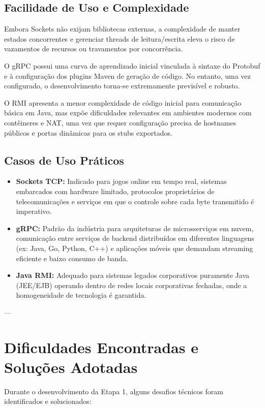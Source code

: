 \documentclass[12pt,a4paper]{article}
\begin{document}
\subsection{Facilidade de Uso e Complexidade}
Embora Sockets não exijam bibliotecas externas, a complexidade de manter estados concorrentes e gerenciar threads de leitura/escrita eleva o risco de vazamentos de recursos ou travamentos por concorrência. 

O gRPC possui uma curva de aprendizado inicial vinculada à sintaxe do Protobuf e à configuração dos plugins Maven de geração de código. No entanto, uma vez configurado, o desenvolvimento torna-se extremamente previsível e robusto.

O RMI apresenta a menor complexidade de código inicial para comunicação básica em Java, mas expõe dificuldades relevantes em ambientes modernos com contêineres e NAT, uma vez que requer configuração precisa de hostnames públicos e portas dinâmicas para os stubs exportados.

\subsection{Casos de Uso Práticos}
\begin{itemize}
    \item \textbf{Sockets TCP:} Indicado para jogos online em tempo real, sistemas embarcados com hardware limitado, protocolos proprietários de telecomunicações e serviços em que o controle sobre cada byte transmitido é imperativo.
    \item \textbf{gRPC:} Padrão da indústria para arquiteturas de microsserviços em nuvem, comunicação entre serviços de backend distribuídos em diferentes linguagens (ex: Java, Go, Python, C++) e aplicações móveis que demandam streaming eficiente e baixo consumo de banda.
    \item \textbf{Java RMI:} Adequado para sistemas legados corporativos puramente Java (JEE/EJB) operando dentro de redes locais corporativas fechadas, onde a homogeneidade de tecnologia é garantida.
\end{itemize}

---

\section{Dificuldades Encontradas e Soluções Adotadas}

Durante o desenvolvimento da Etapa 1, alguns desafios técnicos foram identificados e solucionados:
\end{document}
